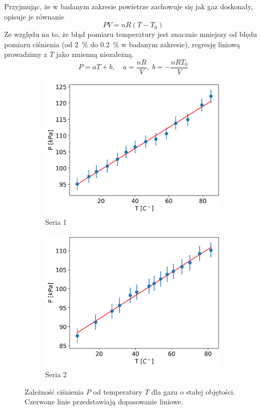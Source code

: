 \documentclass[12pt]{article}
\begin{document}
Przyjmując, że w badanym zakresie powietrze zachowuje się jak gaz doskonały, opisuje je równanie
\[
  PV = nR\left(T - T_0\right)
\]
Ze względu na to, że błąd pomiaru temperatury jest znacznie mniejszy od błędu pomiaru ciśnienia (od \SI{2}{\%} do \SI{0.2}{\%} w badanym zakresie), regresję liniową prowadzimy z \(T\) jako zmienną niezależną.
\[
  P = aT + b, \quad a = \frac{nR}{V}, \; b = -\frac{nRT_0}{V}
\]
\begin{figure}[H]
  \centering
  \begin{subfigure}{0.47\textwidth}
    \includegraphics[width=\linewidth]{izohoric_0}
    \caption{Seria 1}
  \end{subfigure}\hfill
  \begin{subfigure}{0.47\textwidth}
    \includegraphics[width=\linewidth]{izohoric_1}
    \caption{Seria 2}
  \end{subfigure}
  \caption{Zależność ciśnienia \(P\) od temperatury \(T\) dla gazu o stałej objętości. Czerwone linie przedstawiają dopasowanie liniowe.}
  \label{fig:izohoric}
\end{figure}
\end{document}
